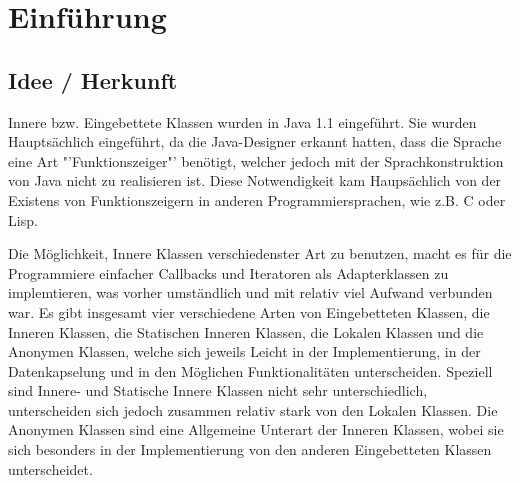 \chapter{Einführung}
\section{Idee / Herkunft}

Innere bzw. Eingebettete Klassen wurden in Java 1.1 eingeführt. \cite{Oracle:JDK_Doku1.1.4}
Sie wurden Hauptsächlich eingeführt, da die Java-Designer erkannt hatten, dass die Sprache eine Art "'Funktionszeiger"' benötigt, welcher jedoch mit der Sprachkonstruktion von Java nicht zu realisieren ist.
Diese Notwendigkeit kam Haupsächlich von der Existens von Funktionszeigern in anderen Programmiersprachen, wie z.B. C oder Lisp.

Die Möglichkeit, Innere Klassen verschiedenster Art zu benutzen, macht es für die Programmiere einfacher Callbacks und Iteratoren als Adapterklassen zu implemtieren, was vorher umständlich und mit relativ viel Aufwand verbunden war.
Es gibt insgesamt vier verschiedene Arten von Eingebetteten Klassen, die Inneren Klassen, die Statischen Inneren Klassen, die Lokalen Klassen und die Anonymen Klassen, welche sich jeweils Leicht in der Implementierung, in der Datenkapselung und in den Möglichen Funktionalitäten unterscheiden.
Speziell sind Innere- und Statische Innere Klassen nicht sehr unterschiedlich, unterscheiden sich jedoch zusammen relativ stark von den Lokalen Klassen.
Die Anonymen Klassen sind eine Allgemeine Unterart der Inneren Klassen, wobei sie sich besonders in der Implementierung von den anderen Eingebetteten Klassen unterscheidet.

\newpage
